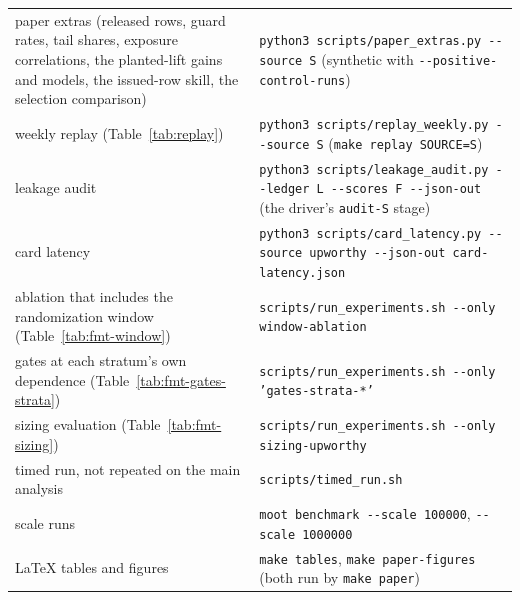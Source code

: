 \begin{table}[t]
{\begin{tabular}{ll}
paper extras (released rows, guard rates, tail shares, exposure correlations, the planted-lift gains and models, the issued-row skill, the selection comparison) & \texttt{python3 scripts/paper\_extras.py -{}-source S} (synthetic with \texttt{-{}-positive-control-runs}) \\
weekly replay (Table~\ref{tab:replay}) & \texttt{python3 scripts/replay\_weekly.py -{}-source S} (\texttt{make replay SOURCE=S}) \\
leakage audit & \texttt{python3 scripts/leakage\_audit.py -{}-ledger L -{}-scores F -{}-json-out} (the driver's \texttt{audit-S} stage) \\
card latency & \texttt{python3 scripts/card\_latency.py -{}-source upworthy -{}-json-out card-latency.json} \\
ablation that includes the randomization window (Table~\ref{tab:fmt-window}) & \texttt{scripts/run\_experiments.sh -{}-only window-ablation} \\
gates at each stratum's own dependence (Table~\ref{tab:fmt-gates-strata}) & \texttt{scripts/run\_experiments.sh -{}-only 'gates-strata-*'} \\
sizing evaluation (Table~\ref{tab:fmt-sizing}) & \texttt{scripts/run\_experiments.sh -{}-only sizing-upworthy} \\
timed run, not repeated on the main analysis & \texttt{scripts/timed\_run.sh} \\
scale runs & \texttt{moot benchmark -{}-scale 100000}, \texttt{-{}-scale 1000000} \\
LaTeX tables and figures & \texttt{make tables}, \texttt{make paper-figures} (both run by \texttt{make paper}) \\
\bottomrule
\end{tabular}}
\end{table}

